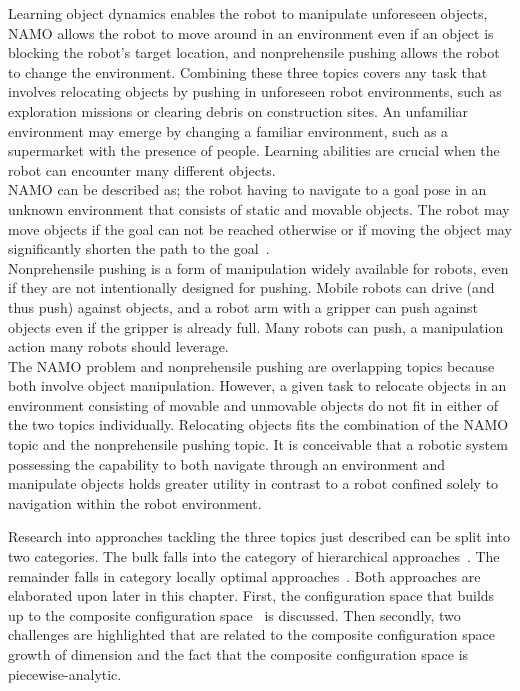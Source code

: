 Learning object dynamics enables the robot to manipulate unforeseen objects, \ac{NAMO} allows the robot to move around in an environment even if an object is blocking the robot's target location, and nonprehensile pushing allows the robot to change the environment. Combining these three topics covers any task that involves relocating objects by pushing in unforeseen robot environments, such as exploration missions or clearing debris on construction sites. An unfamiliar environment may emerge by changing a familiar environment, such as a supermarket with the presence of people. Learning abilities are crucial when the robot can encounter many different objects.\\
\acl{NAMO} can be described as; the robot having to navigate to a goal pose in an unknown environment that consists of static and movable objects. The robot may move objects if the goal can not be reached otherwise or if moving the object may significantly shorten the path to the goal~\cite{hai-ningwu_navigation_2010}.\\
Nonprehensile pushing is a form of manipulation widely available for robots, even if they are not intentionally designed for pushing. Mobile robots can drive (and thus push) against objects, and a robot arm with a gripper can push against objects even if the gripper is already full. Many robots can push, a manipulation action many robots should leverage.\\
The \ac{NAMO} problem and nonprehensile pushing are overlapping topics because both involve object manipulation. However, a given task to relocate objects in an environment consisting of movable and unmovable objects do not fit in either of the two topics individually. Relocating objects fits the combination of the \ac{NAMO} topic and the nonprehensile pushing topic. It is conceivable that a robotic system possessing the capability to both navigate through an environment and manipulate objects holds greater utility in contrast to a robot confined solely to navigation within the robot environment.\bs

Research into approaches tackling the three topics just described can be split into two categories. The bulk falls into the category of hierarchical approaches~\cite{ellis_navigation_2022,krontiris_dealing_2015,scholz_navigation_2016,vega-brown_asymptotically_2020,wang_affordancebased_2020}. The remainder falls in category locally optimal approaches~\cite{novin_dynamic_2018,sabbaghnovin_optimal_2016,sabbaghnovin_model_2021}. Both approaches are elaborated upon later in this chapter. First, the configuration space that builds up to the composite configuration space~\cite{vega-brown_asymptotically_2020} is discussed. Then secondly, two challenges are highlighted that are related to the composite configuration space growth of dimension and the fact that the composite configuration space is piecewise-analytic.\bs

